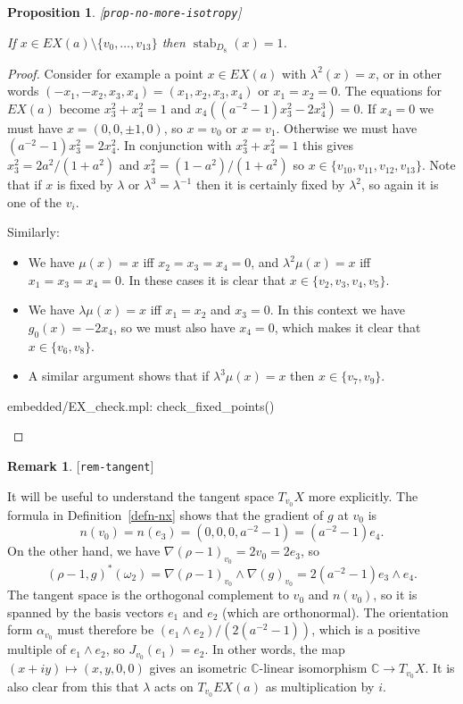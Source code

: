 \documentclass[reqno]{amsart}
\newcommand{\lbl}[1]{\label{#1}\textup{[\texttt{#1}]}\par}
\newcommand{\lbl}{\label}
\newcommand{\stab}	{\operatorname{stab}}
\newcommand{\al}        {\alpha}
\newcommand{\lm}        {\lambda}
\newcommand{\om}        {\omega}
\newcommand{\C}         {{\mathbb{C}}}
\newcommand{\sm}        {\setminus}
\renewcommand{\:}{\colon}
\newtheorem{proposition}[theorem]{Proposition}
\theoremstyle{definition}
\newtheorem{remark}[theorem]{Remark}
\begin{document}
\begin{proposition}\lbl{prop-no-more-isotropy}
 If $x\in EX(a)\sm\{v_0,\dotsc,v_{13}\}$ then $\stab_{D_8}(x)=1$.
\end{proposition}
\begin{proof}
 Consider for example a point $x\in EX(a)$ with $\lm^2(x)=x$, or in other
 words $(-x_1,-x_2,x_3,x_4)=(x_1,x_2,x_3,x_4)$ or $x_1=x_2=0$.  The
 equations for $EX(a)$ become $x_3^2+x_4^2=1$ and
 $x_4((a^{-2}-1)x_3^2-2x_4^3)=0$.  If $x_4=0$ we must have
 $x=(0,0,\pm 1,0)$, so $x=v_0$ or $x=v_1$.  Otherwise we must have
 $(a^{-2}-1)x_3^2=2x_4^2$.  In conjunction with $x_3^2+x_4^2=1$ this gives
 $x_3^2=2a^2/(1+a^2)$ and $x_4^2=(1-a^2)/(1+a^2)$ so
 $x\in\{v_{10},v_{11},v_{12},v_{13}\}$.  Note that if $x$ is fixed by
 $\lm$ or $\lm^3=\lm^{-1}$ then it is certainly fixed by $\lm^2$, so
 again it is one of the $v_i$.

 Similarly:
 \begin{itemize}
  \item We have $\mu(x)=x$ iff $x_2=x_3=x_4=0$, and $\lm^2\mu(x)=x$
   iff $x_1=x_3=x_4=0$.  In these cases it is clear that
   $x\in\{v_2,v_3,v_4,v_5\}$.
  \item We have $\lm\mu(x)=x$ iff $x_1=x_2$ and $x_3=0$.  In this
   context we have $g_0(x)=-2x_4$, so we must also have $x_4=0$, which
   makes it clear that $x\in\{v_6,v_8\}$.
  \item A similar argument shows that if $\lm^3\mu(x)=x$ then
   $x\in\{v_7,v_9\}$.
 \end{itemize}
 \begin{checks}
  embedded/EX_check.mpl: check_fixed_points()
 \end{checks}
\end{proof}

\begin{remark}\lbl{rem-tangent}
 It will be useful to understand the tangent space $T_{v_0}X$ more
 explicitly.  The formula in Definition~\ref{defn-nx} shows that the
 gradient of $g$ at $v_0$ is
 \[ n(v_0) = n(e_3) = (0,0,0,a^{-2}-1) = (a^{-2}-1)e_4. \]
 On the other hand, we have $\nabla(\rho-1)_{v_0}=2v_0=2e_3$, so
 \[ (\rho-1,g)^*(\om_2) =
     \nabla(\rho-1)_{v_0}\wedge\nabla(g)_{v_0} =
      2(a^{-2}-1)e_3\wedge e_4.
 \]
 The tangent space is the orthogonal complement to $v_0$ and $n(v_0)$,
 so it is spanned by the basis vectors $e_1$ and $e_2$ (which are
 orthonormal).  The orientation form $\al_{v_0}$ must therefore be
 $(e_1\wedge e_2)/(2(a^{-2}-1))$, which is a positive multiple of
 $e_1\wedge e_2$, so $J_{v_0}(e_1)=e_2$.  In other words, the map
 $(x+iy)\mapsto(x,y,0,0)$ gives an isometric $\C$-linear isomorphism
 $\C\to T_{v_0}X$.  It is also clear from this that $\lm$ acts on
 $T_{v_0}EX(a)$ as multiplication by $i$.
\end{remark}
\end{document}

